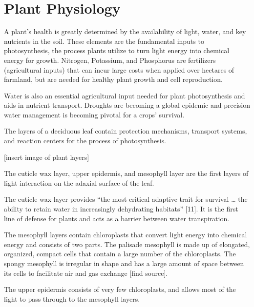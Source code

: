 \section{Plant Physiology}
A plant's health is greatly determined by the availability of light, water, and key nutrients in the soil.  These elements are the fundamental inputs to photosynthesis, the process plants utilize to turn light energy into chemical energy for growth.  Nitrogen, Potassium, and Phosphorus are fertilizers (agricultural inputs) that can incur large costs when applied over hectares of farmland, but are needed for healthy plant growth and cell reproduction.

Water is also an essential agricultural input needed for plant photosynthesis and aids in nutrient transport.  Droughts are becoming a global epidemic and precision water management is becoming pivotal for a crops' survival.

The layers of a deciduous leaf contain protection mechanisms, transport systems, and reaction centers for the process of photosynthesis.

[insert image of plant layers]

The cuticle wax layer, upper epidermis, and mesophyll layer are the first layers of light interaction on the adaxial surface of the leaf.

The cuticle wax layer provides “the most critical adaptive trait for survival … the ability to retain water in increasingly dehydrating habitats” [11].  It is the first line of defense for plants and acts as a barrier between water transpiration.

The mesophyll layers contain chloroplasts that convert light energy into chemical energy and consists of two parts. The palisade mesophyll is made up of elongated, organized, compact cells that contain a large number of the chloroplasts.  The spongy mesophyll is irregular in shape and has a large amount of space between its cells to facilitate air and gas exchange [find source].

The upper epidermis consists of very few chloroplasts, and allows most of the light to pass through to the mesophyll layers.




